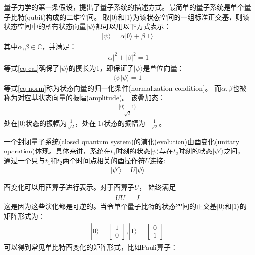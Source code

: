 量子力学的第一条假设，提出了量子系统的描述方式。最简单的量子系统是单个量子比特(qubit)构成的二维空间。
取$|0\rangle$和$|1\rangle$为该状态空间的一组标准正交基，则该状态空间中的所有状态向量$|\psi\rangle$都可以用以下方式表示：
\begin{align}
    |\psi\rangle = \alpha|0\rangle + \beta|1\rangle
\end{align}
其中$\alpha,\beta\in \mathbb{C}$，并满足：
\begin{align}
    |\alpha|^2+|\beta|^2  = 1
    \label{eq-cal}
\end{align}
等式\ref{eq-cal}确保了$|\psi\rangle$的模长为1，即保证了$|\psi\rangle$是单位向量：
\begin{align}
    \langle\psi|\psi\rangle = 1
    \label{eq-norm}
\end{align}
等式\ref{eq-norm}称为状态向量的归一化条件(normalization condition)。
而\(\alpha,\beta\)也被称为对应基状态向量的振幅(amplitude)。
该叠加态：
\begin{align}
    \frac{|0\rangle-|1\rangle}{\sqrt{2}}
\end{align}
处在$|0\rangle$状态的振幅为$\frac{1}{\sqrt{2}}$，处在$|1\rangle$状态的振幅为$-\frac{1}{\sqrt{2}}$。
\begin{theorem}\citep{nielsen2010quantum}
    一个封闭量子系统(closed quantum system)的演化(evolution)由酉变化(unitary operation)体现。具体来讲，系统在$t_1$时刻的状态$|\psi\rangle$与在$t_2$时刻的状态$|\psi'\rangle$之间，通过一个只与$t_1$和$t_2$两个时间点相关的酉操作符$U$连接:
    \begin{align}
        |\psi'\rangle = U|\psi\rangle
    \end{align}
\end{theorem}
酉变化可以用酉算子进行表示。对于酉算子$U$， 始终满足
\begin{align}
    U U^\dagger = I
\end{align}
这是因为这些演化都是可逆的。当令单个量子比特的状态空间的正交基$|0\rangle$和$|1\rangle$的矩阵形式为：
\begin{align}
    |0\rangle = \left[\begin{matrix}
        1\\0
    \end{matrix}\right],|1\rangle = \left[\begin{matrix}
        0\\1
    \end{matrix}\right]
\end{align}
\label{sec-mat}
可以得到常见单比特酉变化的矩阵形式，比如Pauli算子：
